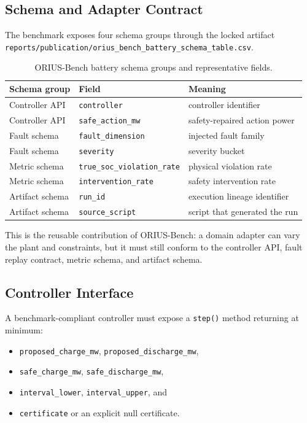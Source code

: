 \subsection{Schema and Adapter Contract}

The benchmark exposes four schema groups through the locked artifact
\texttt{reports/publication/orius\_bench\_battery\_schema\_table.csv}.

\begin{table}[ht]
\centering
\caption{ORIUS-Bench battery schema groups and representative fields.}
\label{tab:orius-bench-schema}
\begin{tabular}{lll}
\toprule
\textbf{Schema group} & \textbf{Field} & \textbf{Meaning} \\
\midrule
Controller API & \texttt{controller} & controller identifier \\
Controller API & \texttt{safe\_action\_mw} & safety-repaired action power \\
Fault schema & \texttt{fault\_dimension} & injected fault family \\
Fault schema & \texttt{severity} & severity bucket \\
Metric schema & \texttt{true\_soc\_violation\_rate} & physical violation rate \\
Metric schema & \texttt{intervention\_rate} & safety intervention rate \\
Artifact schema & \texttt{run\_id} & execution lineage identifier \\
Artifact schema & \texttt{source\_script} & script that generated the run \\
\bottomrule
\end{tabular}
\end{table}

This is the reusable contribution of ORIUS-Bench: a domain adapter can vary
the plant and constraints, but it must still conform to the controller API,
fault replay contract, metric schema, and artifact schema.

\subsection{Controller Interface}

A benchmark-compliant controller must expose a \texttt{step()} method
returning at minimum:
\begin{itemize}
  \item \texttt{proposed\_charge\_mw}, \texttt{proposed\_discharge\_mw},
  \item \texttt{safe\_charge\_mw}, \texttt{safe\_discharge\_mw},
  \item \texttt{interval\_lower}, \texttt{interval\_upper}, and
  \item \texttt{certificate} or an explicit null certificate.
\end{itemize}

